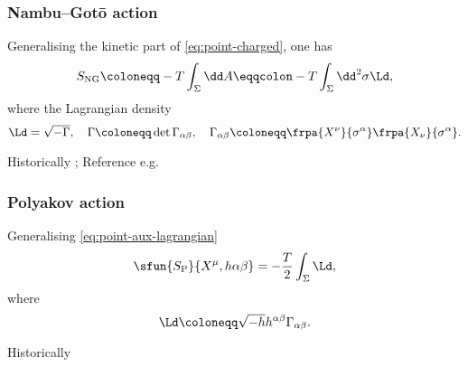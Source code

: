 \documentclass[a4paper,11pt]{article}
\begin{document}
\subsubsection*{Nambu--Gotō action}

Generalising the kinetic part of \eqref{eq:point-charged}, one has
\begin{equation}
S_\text{NG} \coloneqq -T \int_\Sigma \dd A
\eqqcolon -T \int_\Sigma\dd^2\sigma \Ld,
\end{equation}
where the Lagrangian density
\begin{equation}
\Ld = \sqrt{-\Gamma},\quad
\Gamma \coloneqq \det \Gamma_{\alpha\beta},\quad
\Gamma_{\alpha\beta} \coloneqq \frpa{X^\nu}{\sigma^\alpha} 
\frpa{X_\nu}{\sigma^\alpha}.
\end{equation}


Historically \cite{Goto1971,Nambu1970}; Reference e.g.\ 
\cite{Blumenhagen2013,Kiefer2012}

\subsubsection*{Polyakov action}

Generalising \eqref{eq:point-aux-lagrangian}
\begin{equation}
\sfun{S_\text{P}}{X^\mu, h{\alpha\beta}} = -\frac{T}{2}\int_\Sigma \Ld,
\end{equation}
where
\begin{equation}
\Ld \coloneqq \sqrt{-h} h^{\alpha\beta}\Gamma_{\alpha\beta}.
\end{equation}



Historically \cite{Brink1976,Deser1976,Polyakov1981}





\printbibliography
\end{document}
